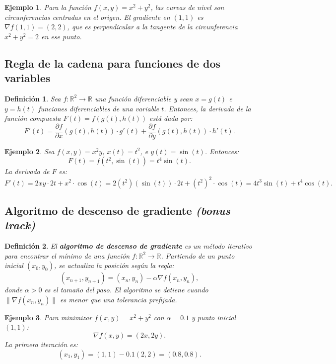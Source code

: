 \documentclass[11pt]{book}
\theoremstyle{definicion}
\newtheorem{definicion}{Definición}[section]
\theoremstyle{teorema}
\theoremstyle{ejemplo}
\newtheorem{ejemplo}{Ejemplo}[section]
\begin{document}
\begin{ejemplo}
Para la función \( f(x, y) = x^2 + y^2 \), las curvas de nivel son circunferencias centradas en el origen. El gradiente en \( (1, 1) \) es \( \nabla f(1, 1) = (2, 2) \), que es perpendicular a la tangente de la circunferencia \( x^2 + y^2 = 2 \) en ese punto.
\end{ejemplo}

\subsection{Regla de la cadena para funciones de dos variables}

\begin{definicion}
Sea \( f: \mathbb{R}^2 \to \mathbb{R} \) una función diferenciable y sean \( x = g(t) \) e \( y = h(t) \) funciones diferenciables de una variable \( t \). Entonces, la derivada de la función compuesta \( F(t) = f(g(t), h(t)) \) está dada por:
\[
F'(t) = \frac{\partial f}{\partial x}(g(t), h(t)) \cdot g'(t) + \frac{\partial f}{\partial y}(g(t), h(t)) \cdot h'(t).
\]
\end{definicion}

\begin{ejemplo}
Sea \( f(x, y) = x^2 y \), \( x(t) = t^2 \), e \( y(t) = \sin(t) \). Entonces:
\[
F(t) = f(t^2, \sin(t)) = t^4 \sin(t).
\]
La derivada de \( F \) es:
\[
F'(t) = 2xy \cdot 2t + x^2 \cdot \cos(t) = 2(t^2)(\sin(t)) \cdot 2t + (t^2)^2 \cdot \cos(t) = 4t^3 \sin(t) + t^4 \cos(t).
\]
\end{ejemplo}

\subsection{Algoritmo de descenso de gradiente \emph{(bonus track)}}

\begin{definicion}
El \textbf{algoritmo de descenso de gradiente} es un método iterativo para encontrar el mínimo de una función \( f: \mathbb{R}^2 \to \mathbb{R} \). Partiendo de un punto inicial \( (x_0, y_0) \), se actualiza la posición según la regla:
\[
(x_{n+1}, y_{n+1}) = (x_n, y_n) - \alpha \nabla f(x_n, y_n),
\]
donde \( \alpha > 0 \) es el tamaño del paso. El algoritmo se detiene cuando \( \|\nabla f(x_n, y_n)\| \) es menor que una tolerancia prefijada.
\end{definicion}

\begin{ejemplo}
Para minimizar \( f(x, y) = x^2 + y^2 \) con \( \alpha = 0.1 \) y punto inicial \( (1, 1) \):
\[
\nabla f(x, y) = (2x, 2y).
\]
La primera iteración es:
\[
(x_1, y_1) = (1, 1) - 0.1(2, 2) = (0.8, 0.8).
\]
\end{ejemplo}
\end{document}
